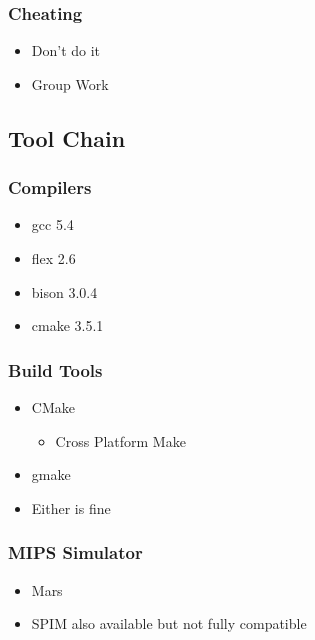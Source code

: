 \documentclass[usepdftitle=false,professionalfonts,compress ]{beamer}
\begin{document}
{
\begin{frame}\frametitle{Cheating}

	\begin{itemize}
	\item Don't do it
			\item Group Work
				\end{itemize}

\end{frame}}




\subsection{Tool Chain}

{
\begin{frame}\frametitle{Compilers}

	\begin{itemize}
	\item gcc 5.4
			\item flex 2.6
			\item bison 3.0.4
      \item cmake 3.5.1
				\end{itemize}

\end{frame}}





{
\begin{frame}\frametitle{Build Tools}

	\begin{itemize}
	\item CMake

	\begin{itemize}
	\item Cross Platform Make
				\end{itemize}

			\item gmake
			\item Either is fine
				\end{itemize}

\end{frame}}





{
\begin{frame}\frametitle{MIPS Simulator}

	\begin{itemize}
	\item Mars
			\item SPIM also available but not fully compatible
				\end{itemize}

\end{frame}}
\end{document}
